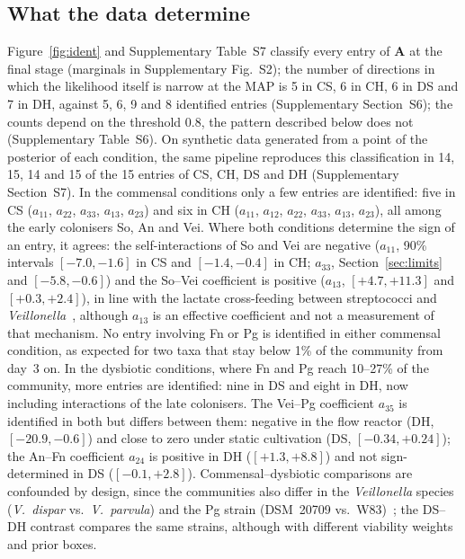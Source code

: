 \documentclass[preprint,12pt]{elsarticle}
\begin{document}
\subsection{What the data determine}
Figure~\ref{fig:ident} and Supplementary Table~S7 classify every entry of $\mathbf{A}$ at the final stage (marginals in Supplementary Fig.~S2); the number of directions in which the likelihood itself is narrow at the MAP is 5 in CS, 6 in CH, 6 in DS and 7 in DH, against 5, 6, 9 and 8 identified entries (Supplementary Section~S6); the counts depend on the threshold 0.8, the pattern described below does not (Supplementary Table~S6). On synthetic data generated from a point of the posterior of each condition, the same pipeline reproduces this classification in 14, 15, 14 and 15 of the 15 entries of CS, CH, DS and DH (Supplementary Section~S7).
In the commensal conditions only a few entries are identified: five in CS ($a_{11}$, $a_{22}$, $a_{33}$, $a_{13}$, $a_{23}$) and six in CH ($a_{11}$, $a_{12}$, $a_{22}$, $a_{33}$, $a_{13}$, $a_{23}$), all among the early colonisers So, An and Vei.
Where both conditions determine the sign of an entry, it agrees: the self-interactions of So and Vei are negative ($a_{11}$, 90\% intervals $[-7.0,-1.6]$ in CS and $[-1.4,-0.4]$ in CH; $a_{33}$, Section~\ref{sec:limits} and $[-5.8,-0.6]$) and the So--Vei coefficient is positive ($a_{13}$, $[+4.7,+11.3]$ and $[+0.3,+2.4]$), in line with the lactate cross-feeding between streptococci and \textit{Veillonella}~\citep{Kolenbrander2010OralMultispecies}, although $a_{13}$ is an effective coefficient and not a measurement of that mechanism.
No entry involving Fn or Pg is identified in either commensal condition, as expected for two taxa that stay below 1\% of the community from day~3 on.
In the dysbiotic conditions, where Fn and Pg reach 10--27\% of the community, more entries are identified: nine in DS and eight in DH, now including interactions of the late colonisers.
The Vei--Pg coefficient $a_{35}$ is identified in both but differs between them: negative in the flow reactor (DH, $[-20.9,-0.6]$) and close to zero under static cultivation (DS, $[-0.34,+0.24]$); the An--Fn coefficient $a_{24}$ is positive in DH ($[+1.3,+8.8]$) and not sign-determined in DS ($[-0.1,+2.8]$).
Commensal--dysbiotic comparisons are confounded by design, since the communities also differ in the \textit{Veillonella} species (\textit{V.~dispar} vs.\ \textit{V.~parvula}) and the Pg strain (DSM~20709 vs.\ W83)~\citep{heine2025influence}; the DS--DH contrast compares the same strains, although with different viability weights and prior boxes.
\end{document}

